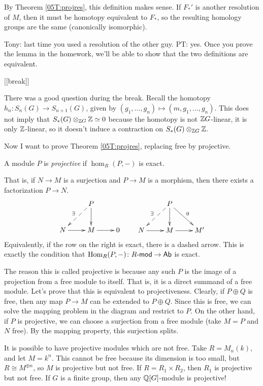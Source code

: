 By Theorem \ref{05T:projres}, this definition makes sense. If $F_*'$ is another resolution of $M$, then it must be homotopy equivalent to $F_*$, so the resulting homology groups are the same (canonically isomorphic).

Tony: last time you used a resolution of the other guy. PT: yes. Once you prove the lemma in the homework, we'll be able to show that the two definitions are equivalent.

[[break]]

There was a good question during the break. Recall the homotopy $h_n\colon S_n(G)\to S_{n+1}(G)$, given by $(g_1,\dots,g_n)\mapsto (m,g_1,\dots, g_n)$. This does not imply that $S_*(G)\otimes_{\mathbb{Z} G}\mathbb{Z}\simeq 0$ because the homotopy is not $\mathbb{Z} G$-linear, it is only $\mathbb{Z}$-linear, so it doesn't induce a contraction on $S_*(G)\otimes_{\mathbb{Z} G}\mathbb{Z}$.

Now I want to prove Theorem \ref{05T:projres}, replacing free by projective.
\begin{definition}
 A module $P$ is \emph{projective} if $\hom_R(P,-)$ is exact.
\end{definition}
That is, if $N\to M$ is a surjection and $P\to M$ is a morphism, then there exists a factorization $P\to N$.
\[\xymatrix{
 & P\ar[d] \ar@{-->}[dl]_\exists \\
 N\ar[r] & M\ar[r] & 0
}\qquad
\xymatrix{
 & P\ar[d] \ar@{-->}[dl]_\exists \ar[dr]^0 \\
 N\ar[r] & M\ar[r] & M'
}\]
Equivalently, if the row on the right is exact, there is a dashed arrow. This is exactly the condition that $\operatorname{Hom}_R(P,-)\colon R\textrm{-\sf mod}\to \text{\sf Ab}$ is exact.

The reason this is called projective is because any such $P$ is the image of a projection from a free module to itself. That is, it is a direct summand of a free module. Let's prove that this is equivalent to projectiveness. Clearly, if $P\oplus Q$ is free, then any map $P\to M$ can be extended to $P\oplus Q$. Since this is free, we can solve the mapping problem in the diagram and restrict to $P$. On the other hand, if $P$ is projective, we can choose a surjection from a free module (take $M=P$ and $N$ free). By the mapping property, this surjection splits.

It is possible to have projective modules which are not free. Take $R=M_n(k)$, and let $M=k^n$. This cannot be free because its dimension is too small, but $R\cong M^{\oplus n}$, so $M$ is projective but not free. If $R=R_1\times R_2$, then $R_1$ is projective but not free. If $G$ is a finite group, then any $\mathbb{Q}[G]$-module is projective!

